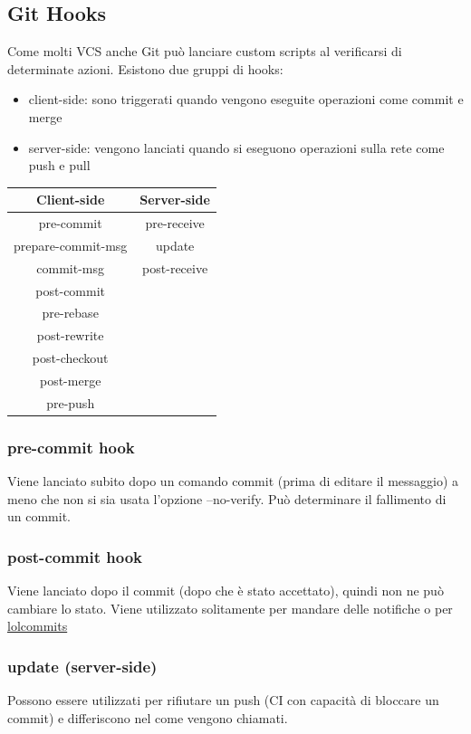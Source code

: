 \subsection{Git Hooks}
Come molti VCS anche Git può lanciare custom scripts al verificarsi di determinate azioni. Esistono due gruppi di hooks: 
\begin{itemize}
    \item client-side: sono triggerati quando vengono eseguite operazioni come commit e merge
    \item server-side: vengono lanciati quando si eseguono operazioni sulla rete come push e pull 
\end{itemize}
\begin{center}
    \begin{tabular}{ |c|c| } 
        \hline
        \textbf{Client-side} & \textbf{Server-side} \\
        \hline
        pre-commit & pre-receive \\ 
        prepare-commit-msg & update \\ 
        commit-msg & post-receive \\ 
        post-commit & \\
        pre-rebase & \\
        post-rewrite & \\
        post-checkout & \\
        post-merge & \\
        pre-push & \\
        \hline
    \end{tabular}
\end{center}
\subsubsection{pre-commit hook}
Viene lanciato subito dopo un comando commit (prima di editare il messaggio) a meno che non si sia usata l'opzione --no-verify. Può determinare il fallimento di un commit.
\subsubsection{post-commit hook}
Viene lanciato dopo il commit (dopo che è stato accettato), quindi non ne può cambiare lo stato. Viene utilizzato solitamente per mandare delle notifiche o per \href{https://lolcommits.github.io/}{lolcommits}
\subsubsection{update (server-side)}
Possono essere utilizzati per rifiutare un push (CI con capacità di bloccare un commit) e differiscono nel come vengono chiamati.
